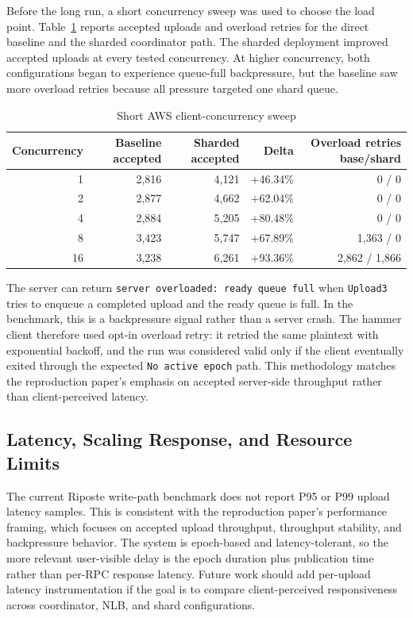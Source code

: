 \documentclass[conference]{IEEEtran}
\begin{document}
Before the long run, a short concurrency sweep was used to choose the load point. Table~\ref{tab:concurrency-sweep} reports accepted uploads and overload retries for the direct baseline and the sharded coordinator path. The sharded deployment improved accepted uploads at every tested concurrency. At higher concurrency, both configurations began to experience queue-full backpressure, but the baseline saw more overload retries because all pressure targeted one shard queue.

\begin{table}[!t]
\centering
\caption{Short AWS client-concurrency sweep}
\label{tab:concurrency-sweep}
\small
\begin{tabular}{r r r r r}
\hline
\textbf{Concurrency} & \textbf{Baseline accepted} & \textbf{Sharded accepted} & \textbf{Delta} & \textbf{Overload retries base/shard} \\
\hline
1 & 2,816 & 4,121 & +46.34\% & 0 / 0 \\
2 & 2,877 & 4,662 & +62.04\% & 0 / 0 \\
4 & 2,884 & 5,205 & +80.48\% & 0 / 0 \\
8 & 3,423 & 5,747 & +67.89\% & 1,363 / 0 \\
16 & 3,238 & 6,261 & +93.36\% & 2,862 / 1,866 \\
\hline
\end{tabular}
\end{table}

The server can return \texttt{server overloaded: ready queue full} when \texttt{Upload3} tries to enqueue a completed upload and the ready queue is full. In the benchmark, this is a backpressure signal rather than a server crash. The hammer client therefore used opt-in overload retry: it retried the same plaintext with exponential backoff, and the run was considered valid only if the client eventually exited through the expected \texttt{No active epoch} path. This methodology matches the reproduction paper's emphasis on accepted server-side throughput rather than client-perceived latency.

\subsection{Latency, Scaling Response, and Resource Limits}

The current Riposte write-path benchmark does not report P95 or P99 upload latency samples. This is consistent with the reproduction paper's performance framing, which focuses on accepted upload throughput, throughput stability, and backpressure behavior. The system is epoch-based and latency-tolerant, so the more relevant user-visible delay is the epoch duration plus publication time rather than per-RPC response latency. Future work should add per-upload latency instrumentation if the goal is to compare client-perceived responsiveness across coordinator, NLB, and shard configurations.
\end{document}
